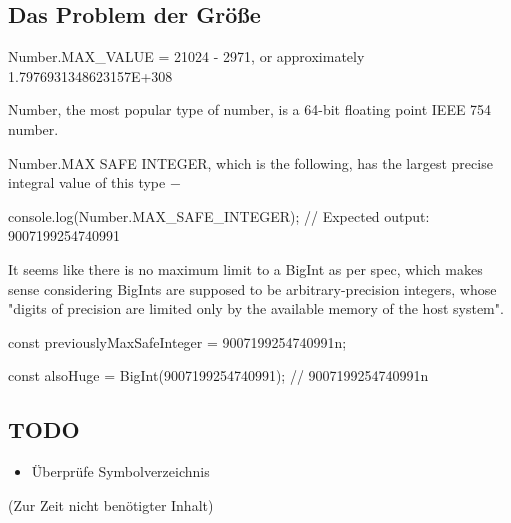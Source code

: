 \documentclass[a4paper]{amsart}
\theoremstyle{definition}
\begin{document}
\subsection{Das Problem der Größe}


Number.MAX_VALUE = 21024 - 2971, or approximately 1.7976931348623157E+308

Number, the most popular type of number, is a 64-bit floating point IEEE 754 number.

Number.MAX SAFE INTEGER, which is the following, has the largest precise integral value of this type −


console.log(Number.MAX_SAFE_INTEGER);
// Expected output: 9007199254740991


It seems like there is no maximum limit to a BigInt as per spec, which makes sense considering BigInts are supposed to be arbitrary-precision integers, whose "digits of precision are limited only by the available memory of the host system".

const previouslyMaxSafeInteger = 9007199254740991n;

const alsoHuge = BigInt(9007199254740991);
// 9007199254740991n



\begin{backup}
\section{TODO}
\begin{itemize}
     \item Überprüfe Symbolverzeichnis
\end{itemize}


\end{backup}

\begin{backup}
    (Zur Zeit nicht benötigter Inhalt)
\end{backup}
\end{document}
